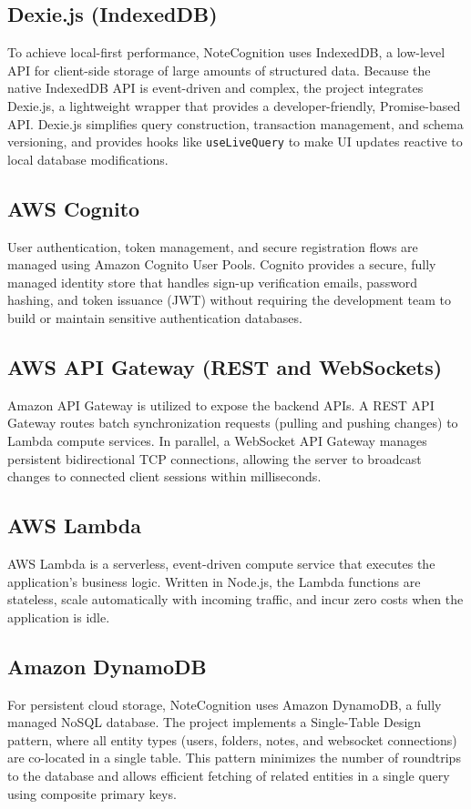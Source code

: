 \documentclass[12pt, a4paper, oneside]{report}
\begin{document}
\subsection{Dexie.js (IndexedDB)}
To achieve local-first performance, NoteCognition uses IndexedDB, a low-level API for client-side storage of large amounts of structured data. Because the native IndexedDB API is event-driven and complex, the project integrates Dexie.js, a lightweight wrapper that provides a developer-friendly, Promise-based API. Dexie.js simplifies query construction, transaction management, and schema versioning, and provides hooks like \texttt{useLiveQuery} to make UI updates reactive to local database modifications.

\subsection{AWS Cognito}
User authentication, token management, and secure registration flows are managed using Amazon Cognito User Pools. Cognito provides a secure, fully managed identity store that handles sign-up verification emails, password hashing, and token issuance (JWT) without requiring the development team to build or maintain sensitive authentication databases.

\subsection{AWS API Gateway (REST and WebSockets)}
Amazon API Gateway is utilized to expose the backend APIs. A REST API Gateway routes batch synchronization requests (pulling and pushing changes) to Lambda compute services. In parallel, a WebSocket API Gateway manages persistent bidirectional TCP connections, allowing the server to broadcast changes to connected client sessions within milliseconds.

\subsection{AWS Lambda}
AWS Lambda is a serverless, event-driven compute service that executes the application's business logic. Written in Node.js, the Lambda functions are stateless, scale automatically with incoming traffic, and incur zero costs when the application is idle.

\subsection{Amazon DynamoDB}
For persistent cloud storage, NoteCognition uses Amazon DynamoDB, a fully managed NoSQL database. The project implements a Single-Table Design pattern, where all entity types (users, folders, notes, and websocket connections) are co-located in a single table. This pattern minimizes the number of roundtrips to the database and allows efficient fetching of related entities in a single query using composite primary keys.
\end{document}
